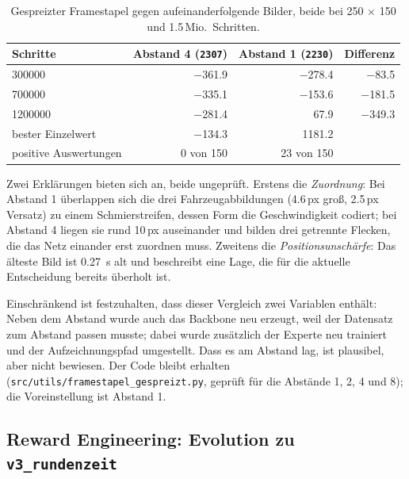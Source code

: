 \begin{table}[htbp]
  \centering
  \caption{Gespreizter Framestapel gegen aufeinanderfolgende Bilder, beide bei \num{250} $\times$ \num{150} und \num{1.5}\,Mio.\ Schritten.}
  \label{tab:spreizung}
  \begin{tabular}{@{}l r r r@{}}
    \toprule
    \textbf{Schritte} & \textbf{Abstand 4 (\texttt{2307})} & \textbf{Abstand 1 (\texttt{2230})} & \textbf{Differenz} \\
    \midrule
    \num{300000}   & \num{-361.9} & \num{-278.4} & \num{-83.5}  \\
    \num{700000}   & \num{-335.1} & \num{-153.6} & \num{-181.5} \\
    \num{1200000}  & \num{-281.4} & \num{+67.9}  & \num{-349.3} \\
    \midrule
    bester Einzelwert & \num{-134.3} & \num{1181.2} & \\
    positive Auswertungen & \num{0} von \num{150} & \num{23} von \num{150} & \\
    \bottomrule
  \end{tabular}
\end{table}

Zwei Erklärungen bieten sich an, beide ungeprüft. Erstens die \emph{Zuordnung}: Bei Abstand \num{1} überlappen sich die drei Fahrzeugabbildungen (\num{4.6}\,px groß, \num{2.5}\,px Versatz) zu einem Schmierstreifen, dessen Form die Geschwindigkeit codiert; bei Abstand \num{4} liegen sie rund \num{10}\,px auseinander und bilden drei getrennte Flecken, die das Netz einander erst zuordnen muss. Zweitens die \emph{Positionsunschärfe}: Das älteste Bild ist \SI{0.27}{\second} alt und beschreibt eine Lage, die für die aktuelle Entscheidung bereits überholt ist.

Einschränkend ist festzuhalten, dass dieser Vergleich zwei Variablen enthält: Neben dem Abstand wurde auch das Backbone neu erzeugt, weil der Datensatz zum Abstand passen musste; dabei wurde zusätzlich der Experte neu trainiert und der Aufzeichnungspfad umgestellt. Dass es am Abstand lag, ist plausibel, aber nicht bewiesen. Der Code bleibt erhalten (\texttt{src/utils/framestapel\_gespreizt.py}, geprüft für die Abstände 1, 2, 4 und 8); die Voreinstellung ist Abstand \num{1}.

\subsection{Reward Engineering: Evolution zu \texttt{v3\_rundenzeit}}
\label{subsubsec:reward_engineering}

